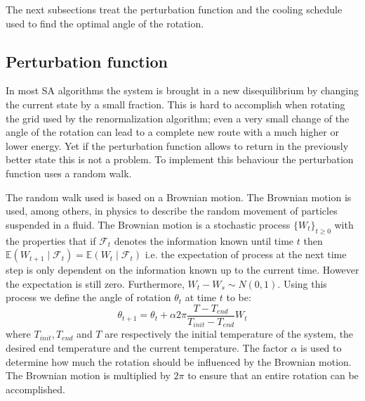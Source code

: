 The next subsections treat the perturbation function and the cooling schedule used
to find the optimal angle of the rotation.

\subsection{Perturbation function}
In most SA algorithms the system is brought in a new
disequilibrium by changing the current state by a small fraction. This is hard
to accomplish when rotating the grid used by the renormalization algorithm;
even a very small change of the angle of the rotation can lead to a complete
new route with a much higher or lower energy. Yet if the perturbation function
allows to return in the previously better state this is not a problem. To
implement this behaviour the perturbation function uses a random walk.

\newcommand{\expt}{\ensuremath{\mathbb{E}}}
The random walk used is based on a Brownian motion\cite{brown1829bam}. The
Brownian motion is used, among others, in physics to describe the random
movement of particles suspended in a fluid. The Brownian motion is
a stochastic process $\lbrace W_t\rbrace_{t\geq 0}$ with the properties that
if $\mathcal{F}_t$ denotes the information known until time $t$ then 
$\expt(W_{t + 1}\mid \mathcal{F}_t) = \expt(W_t \mid \mathcal{F}_t)$ i.e. the
expectation of process at the next time step is only dependent on the
information known up to the current time. However the expectation is still
zero. Furthermore, $W_t - W_s \sim N(0, 1)$. Using this process we define the
angle of rotation $\theta_t$ at time $t$ to be:
\begin{equation}\label{eq:rot}
\theta_{t + 1} = \theta_{t} + \alpha 2\pi\frac{T - T_{end}}
	{T_{init} - T_{end}}W_t
\end{equation}
where $T_{init}, T_{end}$ and $T$ are respectively the initial temperature of
the system, the desired end temperature and the current temperature. The
factor $\alpha$ is used to determine how much the rotation should be influenced
by the Brownian motion. The Brownian motion is multiplied by $2\pi$ to ensure
that an entire rotation can be accomplished.

